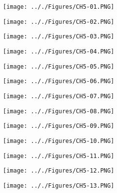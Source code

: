 \documentclass[onecolumn,11pt]{report}
\def\lthtmlcheckvsize{\ifdim\ht\sizebox<\vsize 
  \ifdim\wd\sizebox<\hsize\expandafter\hfill\fi \expandafter\vfill
  \else\expandafter\vss\fi}%
\begin{document}
{\newpage\clearpage
{}%
\texttt{[image: .././Figures/CH5-01.PNG]}%
\lthtmlpictureZ
\lthtmlcheckvsize\clearpage}

{\newpage\clearpage
{}%
\texttt{[image: .././Figures/CH5-02.PNG]}%
\lthtmlpictureZ
\lthtmlcheckvsize\clearpage}

{\newpage\clearpage
{}%
\texttt{[image: .././Figures/CH5-03.PNG]}%
\lthtmlpictureZ
\lthtmlcheckvsize\clearpage}

{\newpage\clearpage
{}%
\texttt{[image: .././Figures/CH5-04.PNG]}%
\lthtmlpictureZ
\lthtmlcheckvsize\clearpage}

{\newpage\clearpage
{}%
\texttt{[image: .././Figures/CH5-05.PNG]}%
\lthtmlpictureZ
\lthtmlcheckvsize\clearpage}

{\newpage\clearpage
{}%
\texttt{[image: .././Figures/CH5-06.PNG]}%
\lthtmlpictureZ
\lthtmlcheckvsize\clearpage}

{\newpage\clearpage
{}%
\texttt{[image: .././Figures/CH5-07.PNG]}%
\lthtmlpictureZ
\lthtmlcheckvsize\clearpage}

{\newpage\clearpage
{}%
\texttt{[image: .././Figures/CH5-08.PNG]}%
\lthtmlpictureZ
\lthtmlcheckvsize\clearpage}

{\newpage\clearpage
{}%
\texttt{[image: .././Figures/CH5-09.PNG]}%
\lthtmlpictureZ
\lthtmlcheckvsize\clearpage}

{\newpage\clearpage
{}%
\texttt{[image: .././Figures/CH5-10.PNG]}%
\lthtmlpictureZ
\lthtmlcheckvsize\clearpage}

{\newpage\clearpage
{}%
\texttt{[image: .././Figures/CH5-11.PNG]}%
\lthtmlpictureZ
\lthtmlcheckvsize\clearpage}

{\newpage\clearpage
{}%
\texttt{[image: .././Figures/CH5-12.PNG]}%
\lthtmlpictureZ
\lthtmlcheckvsize\clearpage}

{\newpage\clearpage
{}%
\texttt{[image: .././Figures/CH5-13.PNG]}%
\lthtmlpictureZ
\lthtmlcheckvsize\clearpage}
\end{document}
